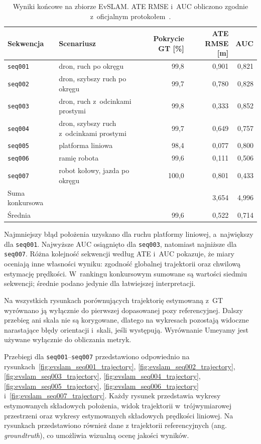 \begin{table}[!ht]
    \centering
    \small
    \caption{Wyniki końcowe na zbiorze EvSLAM. ATE RMSE i~AUC obliczono zgodnie z~oficjalnym protokołem~\cite{zhong2026evslam,evslam2026evaluation}.}
    \label{tab:wyniki_evslam_final}
    \begin{tabularx}{\textwidth}{l X r r r}
        \toprule
        Sekwencja & Scenariusz & Pokrycie GT [\%] & ATE RMSE [m] & AUC \\
        \midrule
        \texttt{seq001} & dron, ruch po okręgu & 99,8 & 0,901 & 0,821 \\
        \texttt{seq002} & dron, szybszy ruch po okręgu & 99,7 & 0,780 & 0,828 \\
        \texttt{seq003} & dron, ruch z~odcinkami prostymi & 99,8 & 0,333 & 0,852 \\
        \texttt{seq004} & dron, szybszy ruch z~odcinkami prostymi & 99,7 & 0,649 & 0,757 \\
        \texttt{seq005} & platforma liniowa & 98,4 & 0,077 & 0,800 \\
        \texttt{seq006} & ramię robota & 99,6 & 0,111 & 0,506 \\
        \texttt{seq007} & robot kołowy, jazda po okręgu & 100,0 & 0,801 & 0,433 \\
        \midrule
        Suma konkursowa & & & 3,654 & 4,996 \\
        Średnia & & 99,6 & 0,522 & 0,714 \\
        \bottomrule
    \end{tabularx}
\end{table}

Najmniejszy błąd położenia uzyskano dla ruchu platformy liniowej, a~największy dla \texttt{seq001}. Najwyższe AUC osiągnięto dla \texttt{seq003}, natomiast najniższe dla \texttt{seq007}. Różna kolejność sekwencji według ATE i~AUC pokazuje, że miary oceniają inne własności wyniku: zgodność globalnej trajektorii oraz chwilową estymację prędkości. W~rankingu konkursowym sumowane są wartości siedmiu sekwencji; średnie podano jedynie dla łatwiejszej interpretacji.

Na wszystkich rysunkach porównujących trajektorię estymowaną z~GT wyrównano ją wyłącznie do pierwszej dopasowanej pozy referencyjnej. Dalszy przebieg ani skala nie są korygowane, dlatego na wykresach pozostają widoczne narastające błędy orientacji i~skali, jeśli występują. Wyrównanie Umeyamy jest używane wyłącznie do obliczania metryk.

Przebiegi dla \texttt{seq001}--\texttt{seq007} przedstawiono odpowiednio na rysunkach~\ref{fig:evslam_seq001_trajectory}, \ref{fig:evslam_seq002_trajectory}, \ref{fig:evslam_seq003_trajectory}, \ref{fig:evslam_seq004_trajectory}, \ref{fig:evslam_seq005_trajectory}, \ref{fig:evslam_seq006_trajectory} i~\ref{fig:evslam_seq007_trajectory}. Każdy rysunek przedstawia wykresy estymowanych składowych położenia, widok trajektorii w~trójwymiarowej przestrzeni oraz wykresy estymowanych składowych prędkości liniowej. Na rysunkach przedstawiono również dane z trajektorii referencyjnych (ang. \textit{groundtruth}), co umożliwia wizualną ocenę jakości wyników.

